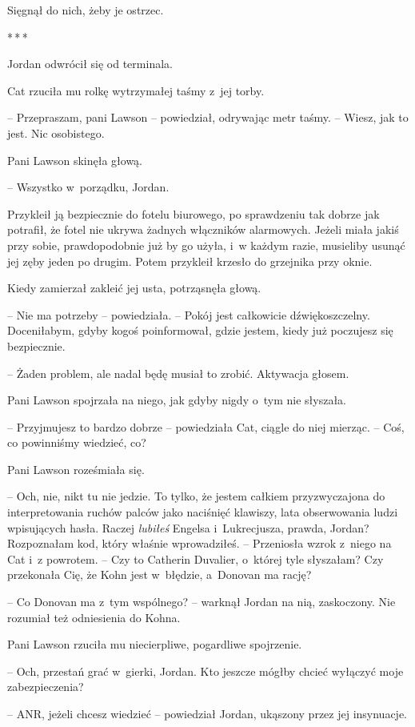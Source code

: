 \documentclass[oneside,polish,11pt,sfheadings]{mwbk}
\newcommand{\threeast}{\bigskip\par\centerline{*\,*\,*}\medskip\par}%
\begin{document}
Sięgnął do nich, żeby je ostrzec.
  \threeast 

Jordan odwrócił się od terminala.

Cat rzuciła mu rolkę wytrzymałej taśmy z~jej torby.

-- Przepraszam, pani Lawson -- powiedział, odrywając metr taśmy. -- Wiesz,
jak to jest. Nic osobistego.

Pani Lawson skinęła głową. 

-- Wszystko w~porządku, Jordan.

Przykleił ją bezpiecznie do fotelu biurowego, po sprawdzeniu tak dobrze
jak potrafił, że fotel nie ukrywa żadnych włączników alarmowych. Jeżeli
miała jakiś przy sobie, prawdopodobnie już by go użyła, i~w każdym
razie, musieliby usunąć jej zęby jeden po drugim. Potem przykleił
krzesło do grzejnika przy oknie.

Kiedy zamierzał zakleić jej usta, potrząsnęła głową.

-- Nie ma potrzeby -- powiedziała. -- Pokój jest całkowicie
dźwiękoszczelny. Doceniłabym, gdyby kogoś poinformował, gdzie jestem,
kiedy już poczujesz się bezpiecznie.

-- Żaden problem, ale nadal będę musiał to zrobić. Aktywacja głosem.

Pani Lawson spojrzała na niego, jak gdyby nigdy o~tym nie słyszała.

-- Przyjmujesz to bardzo dobrze -- powiedziała Cat, ciągle do niej
mierząc. -- Coś, co powinniśmy wiedzieć, co?

Pani Lawson roześmiała się. 

-- Och, nie, nikt tu nie jedzie. To tylko, że
jestem całkiem przyzwyczajona do interpretowania ruchów palców jako
naciśnięć klawiszy, lata obserwowania ludzi wpisujących hasła. Raczej
\emph{lubiłeś} Engelsa i~Lukrecjusza, prawda, Jordan? Rozpoznałam kod,
który właśnie wprowadziłeś. -- Przeniosła wzrok z~niego na Cat i~z powrotem. -- Czy to Catherin Duvalier, o~której tyle słyszałam? Czy
przekonała Cię, że Kohn jest w~błędzie, a~Donovan ma rację?

-- Co Donovan ma z~tym wspólnego? -- warknął Jordan na nią, zaskoczony.
Nie rozumiał też odniesienia do Kohna.

Pani Lawson rzuciła mu niecierpliwe, pogardliwe spojrzenie. 

-- Och,
przestań grać w~gierki, Jordan. Kto jeszcze mógłby chcieć wyłączyć moje
zabezpieczenia?

-- ANR, jeżeli chcesz wiedzieć -- powiedział Jordan, ukąszony przez jej
insynuacje.
\end{document}
